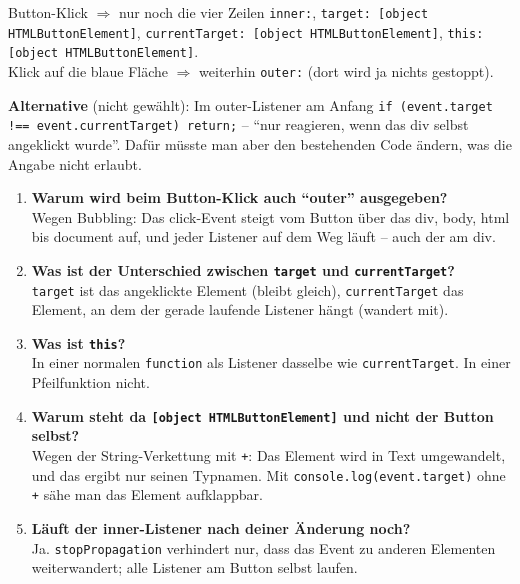 \documentclass[a4paper,11pt]{article}
\begin{document}
\begin{ergebnis}
Button-Klick $\Rightarrow$ nur noch die vier Zeilen \texttt{inner:}, \texttt{target: [object HTMLButtonElement]},
\texttt{currentTarget: [object HTMLButtonElement]}, \texttt{this: [object HTMLButtonElement]}.\\
Klick auf die blaue Fläche $\Rightarrow$ weiterhin \texttt{outer:} (dort wird ja nichts gestoppt).
\end{ergebnis}

\textbf{Alternative} (nicht gewählt): Im outer-Listener am Anfang \lstinline|if (event.target !== event.currentTarget) return;|
-- "`nur reagieren, wenn das div selbst angeklickt wurde"'. Dafür müsste man aber den bestehenden Code ändern,
was die Angabe nicht erlaubt.

\begin{tutor}
\begin{enumerate}[leftmargin=*]
\item \textbf{Warum wird beim Button-Klick auch "`outer"' ausgegeben?}\\
  Wegen Bubbling: Das click-Event steigt vom Button über das div, body, html bis document auf, und jeder Listener
  auf dem Weg läuft -- auch der am div.
\item \textbf{Was ist der Unterschied zwischen \texttt{target} und \texttt{currentTarget}?}\\
  \texttt{target} ist das angeklickte Element (bleibt gleich), \texttt{currentTarget} das Element, an dem der gerade
  laufende Listener hängt (wandert mit).
\item \textbf{Was ist \texttt{this}?}\\
  In einer normalen \texttt{function} als Listener dasselbe wie \texttt{currentTarget}. In einer Pfeilfunktion nicht.
\item \textbf{Warum steht da \texttt{[object HTMLButtonElement]} und nicht der Button selbst?}\\
  Wegen der String-Verkettung mit \texttt{+}: Das Element wird in Text umgewandelt, und das ergibt nur seinen Typnamen.
  Mit \texttt{console.log(event.target)} ohne \texttt{+} sähe man das Element aufklappbar.
\item \textbf{Läuft der inner-Listener nach deiner Änderung noch?}\\
  Ja. \texttt{stopPropagation} verhindert nur, dass das Event zu anderen Elementen weiterwandert; alle Listener am
  Button selbst laufen.
\end{enumerate}
\end{tutor}
\end{document}
